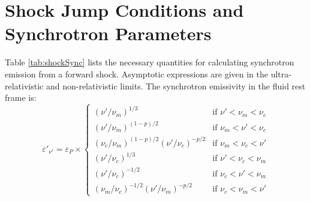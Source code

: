 \documentclass[twocolumn]{aastex62}
\begin{document}
\section{Shock Jump Conditions and Synchrotron Parameters}
\label{sec:shockJump}

Table \ref{tab:shockSync} lists the necessary quantities for calculating synchrotron emission from a forward shock.  Asymptotic expressions are given in the ultra-relativistic and non-relativistic limits.  The synchrotron emissivity in the fluid rest frame is:
\begin{equation}
	\varepsilon'_{\nu'} = \varepsilon_P \times \left \{ \begin{matrix}
											\left(\nu' / \nu_m\right)^{1/3} & \text{if } \nu' < \nu_m < \nu_c \\
											\left(\nu' / \nu_m\right)^{(1-p)/2} & \text{if } \nu_m < \nu'  < \nu_c \\
											\left(\nu_c/\nu_m\right)^{(1-p)/2}\left(\nu' / \nu_c\right)^{-p/2} & \text{if }\nu_m < \nu_c < \nu'\\
											\left(\nu' / \nu_c\right)^{1/3} & \text{if } \nu' < \nu_c < \nu_m \\
											\left(\nu' / \nu_c\right)^{-1/2} & \text{if } \nu_c <\nu' <  \nu_m \\
											\left(\nu_m / \nu_c\right)^{-1/2}\left(\nu' / \nu_m\right)^{-p/2} & \text{if } \nu_c < \nu_m < \nu'
											\end{matrix} \right .
\end{equation}
\end{document}
